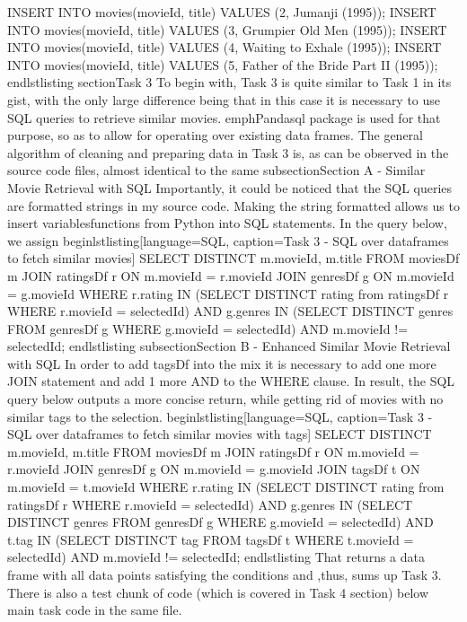 INSERT INTO movies(movieId, title) VALUES (2, Jumanji (1995));
INSERT INTO movies(movieId, title) VALUES (3, Grumpier Old Men (1995));
INSERT INTO movies(movieId, title) VALUES (4, Waiting to Exhale (1995));
INSERT INTO movies(movieId, title) VALUES (5, Father of the Bride Part II (1995));
end{lstlisting}
section{Task 3}
To begin with, Task 3 is quite similar to Task 1 in its gist, with the only large difference being 
that in this case it is necessary to use SQL queries to retrieve similar movies. emph{Pandasql} package 
is used for that  purpose, so as to allow  for operating over existing data frames.
The general algorithm of cleaning and preparing data in Task 3 is, as can be observed in the source code files, almost identical to the same 
subsection{Section A - Similar  Movie Retrieval with SQL}
Importantly, it could be noticed that the SQL queries are formatted strings in my source code. Making  the string
formatted allows us to insert variablesfunctions from Python into SQL statements.
In the query below, we assign 
begin{lstlisting}[language=SQL, caption=Task 3 - SQL over dataframes to fetch similar movies]
SELECT DISTINCT m.movieId, m.title 
FROM moviesDf m 
JOIN ratingsDf r ON m.movieId = r.movieId 
JOIN genresDf g ON m.movieId =  g.movieId 
WHERE r.rating IN (SELECT DISTINCT rating from ratingsDf r WHERE r.movieId = {selectedId}) 
AND g.genres IN (SELECT DISTINCT genres  FROM genresDf g WHERE g.movieId = {selectedId}) 
AND m.movieId != {selectedId};
end{lstlisting}
subsection{Section B - Enhanced Similar  Movie Retrieval with SQL}
In order to add tagsDf into the mix it is necessary to add one more JOIN statement and add 1 more AND to the WHERE clause. In result, the SQL query below outputs a more concise return, while getting rid of movies with no similar tags to the selection.
begin{lstlisting}[language=SQL, caption=Task 3 - SQL over dataframes to fetch similar movies with tags]
SELECT DISTINCT m.movieId, m.title
FROM moviesDf m 
JOIN ratingsDf r ON m.movieId = r.movieId 
JOIN genresDf g ON m.movieId =  g.movieId 
JOIN tagsDf t ON m.movieId = t.movieId 
WHERE r.rating IN (SELECT DISTINCT rating from ratingsDf r WHERE r.movieId = {selectedId}) 
AND g.genres IN (SELECT DISTINCT genres  FROM genresDf g WHERE g.movieId = {selectedId}) 
AND t.tag IN (SELECT DISTINCT tag  FROM tagsDf t WHERE t.movieId = {selectedId}) 
AND m.movieId != {selectedId};
end{lstlisting}
That returns a data frame with all data points satisfying the conditions and ,thus, sums up Task 3. There is also a test chunk of code (which is covered in Task 4 section) below main task code in the same file.
